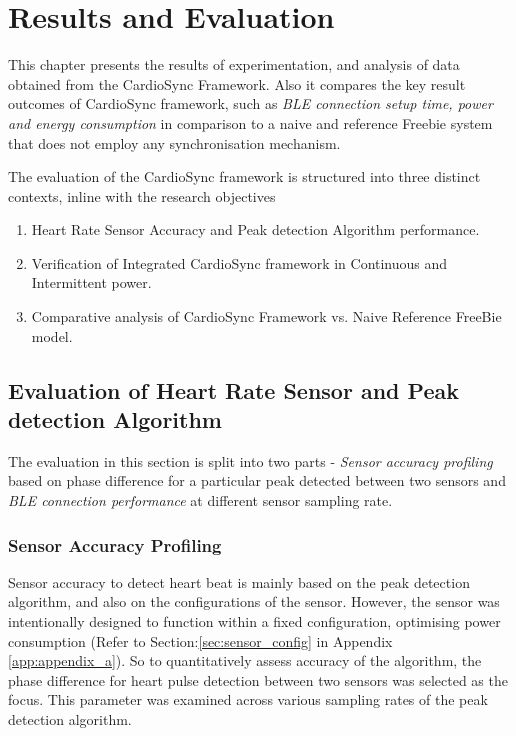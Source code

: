 \chapter{Results and Evaluation}
\label{chap:results}

This chapter presents the results of experimentation, and analysis of data obtained from the CardioSync Framework. Also it compares the key result outcomes of CardioSync framework, such as \textit{BLE connection setup time, power and energy consumption} in comparison to a naive and reference Freebie system that does not employ any synchronisation mechanism. 
\vspace{1\baselineskip}

\noindent The evaluation of the CardioSync framework is structured into three distinct contexts, inline with the research objectives
\begin{enumerate}
    \item Heart Rate Sensor Accuracy and Peak detection Algorithm performance.

    \item Verification of Integrated CardioSync framework in Continuous and Intermittent power.

    \item Comparative analysis of CardioSync Framework vs. Naive Reference FreeBie model.
\end{enumerate}

\section{Evaluation of Heart Rate Sensor and Peak detection Algorithm}
\label{sec:sensor_performance}
The evaluation in this section is split into two parts - \textit{Sensor accuracy profiling} based on phase difference for a particular peak detected between two sensors and \textit{BLE connection performance} at different sensor sampling rate.

\subsection{Sensor Accuracy Profiling}
Sensor accuracy to detect heart beat is mainly based on the peak detection algorithm, and also on the configurations of the sensor. However, the sensor was intentionally designed to function within a fixed configuration, optimising power consumption (Refer to Section:\ref{sec:sensor_config} in Appendix \ref{app:appendix_a}). So to quantitatively assess accuracy of the algorithm, the phase difference for heart pulse detection between two sensors was selected as the focus. This parameter was examined across various sampling rates of the peak detection algorithm.

